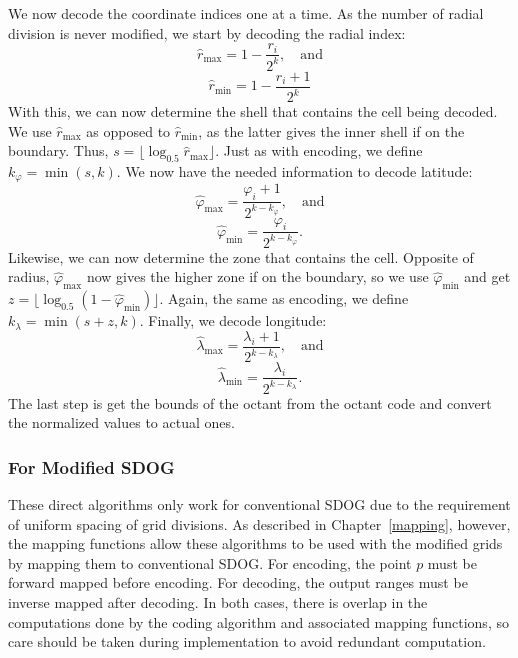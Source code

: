 We now decode the coordinate indices one at a time.
As the number of radial division is never modified, we start by decoding the radial index: 
%
\begin{equation*}
\hat{r}_\mathrm{max} = 1 - \frac{r_i}{2^k}, \quad \text{and}
\end{equation*}
%
\begin{equation*}
\hat{r}_\mathrm{min} = 1 - \frac{r_i + 1}{2^k}
\end{equation*}
%
With this, we can now determine the shell that contains the cell being decoded.
We use $\hat{r}_\mathrm{max}$ as opposed to $\hat{r}_\mathrm{min}$, as the latter gives the inner shell if on the boundary. Thus, $s = \lfloor \log_{0.5} \hat{r}_\mathrm{max} \rfloor$.
Just as with encoding, we define $k_\varphi = \min ( s, k )$.
We now have the needed information to decode latitude:
%
\begin{equation*}
\hat{\varphi}_\mathrm{max} = \frac{\varphi_i + 1}{2^{k - k_\varphi}}, \quad \text{and}
\end{equation*}
%
\begin{equation*}
\hat{\varphi}_\mathrm{min} = \frac{\varphi_i}{2^{k - k_\varphi}}.
\end{equation*}
%
Likewise, we can now determine the zone that contains the cell.
Opposite of radius, $\hat{\varphi}_\mathrm{max}$ now gives the higher zone if on the boundary, so we use $\hat{\varphi}_\mathrm{min}$ and get $z = \lfloor \log_{0.5} ( 1 - \hat{\varphi}_\mathrm{min} ) \rfloor$.
Again, the same as encoding, we define $k_\lambda = \min ( s + z, k )$.
Finally, we decode longitude:
%
\begin{equation*}
\hat{\lambda}_\mathrm{max} = \frac{\lambda_i + 1}{2^{k - k_\lambda}}, \quad \text{and}
\end{equation*}
%
\begin{equation*}
\hat{\lambda}_\mathrm{min} = \frac{\lambda_i}{2^{k - k_\lambda}}.
\end{equation*}
%
The last step is get the bounds of the octant from the octant code and convert the normalized values to actual ones.


\subsubsection{For Modified SDOG}
These direct algorithms only work for conventional SDOG due to the requirement of uniform spacing of grid divisions.
As described in Chapter~\ref{mapping}, however, the mapping functions allow these algorithms to be used with the modified grids by mapping them to conventional SDOG.
For encoding, the point $p$ must be forward mapped before encoding.
For decoding, the output ranges must be inverse mapped after decoding.
In both cases, there is overlap in the computations done by the coding algorithm and associated mapping functions, so care should be taken during implementation to avoid redundant computation.



